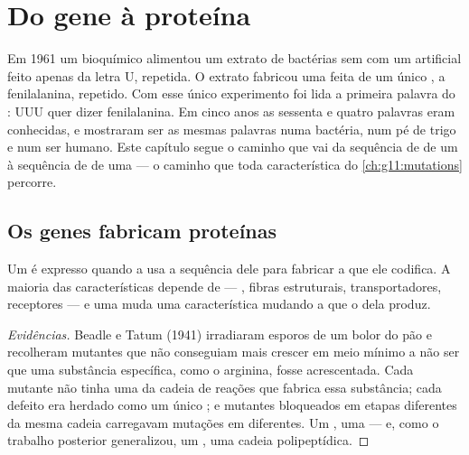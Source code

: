 \chapter{Do gene à proteína}\label{ch:g11:gene-expression}

Em 1961 um bioquímico alimentou um extrato de bactérias sem  com
um  artificial feito apenas da letra U, repetida. O extrato fabricou
uma  feita de um único , a fenilalanina, repetido.
Com esse único experimento foi lida a primeira palavra do : UUU quer dizer fenilalanina. Em cinco anos as sessenta e
quatro palavras eram conhecidas, e mostraram ser as mesmas palavras
numa bactéria, num pé de trigo e num ser humano. Este capítulo segue o
caminho que vai da sequência de  de um  à sequência de
 de uma  --- o caminho que toda característica do
\cref{ch:g11:mutations} percorre.

\section{Os genes fabricam proteínas}

\begin{proposition}\label{prop:g11:gene-expression:onegene}
Um  é expresso quando a  usa a sequência dele para fabricar a
 que ele codifica. A maioria das características depende de
 --- , fibras estruturais, transportadores, receptores
--- e uma  muda uma característica mudando a  que o 
dela produz.
\end{proposition}
\begin{proof}[Evidências]
Beadle e Tatum (1941) irradiaram esporos de um bolor do pão e
recolheram mutantes que não conseguiam mais crescer em meio mínimo a
não ser que uma substância específica, como o  arginina,
fosse acrescentada. Cada mutante não tinha uma  da cadeia de
reações que fabrica essa substância; cada defeito era herdado como um
único ; e mutantes bloqueados em etapas diferentes da mesma cadeia
carregavam mutações em  diferentes. Um , uma  --- e,
como o trabalho posterior generalizou, um , uma cadeia
polipeptídica.
\end{proof}

